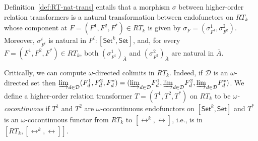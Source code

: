 \documentclass{lmcs}
\theoremstyle{plain}\newtheorem{satz}[thm]{Satz}
\newcommand{\cal}{\mathcal}
\newcommand{\set}{\mathsf{Set}}
\begin{document}
{Definition~\ref{def:RT-nat-trans} entails that a morphism $\sigma$
between higher-order relation transformers is a natural transformation
between endofunctors on $RT_k$ whose component at $F = (F^1,F^2,F^*)
\in RT_k$ is given by $\sigma_F = (\sigma^1_{F^1}, \sigma^2_{F^2})$.
Moreover, $\sigma^i_{F^i}$ is natural in $F^i : [\set^k,\set]$, and,
for every $F = (F^1,F^2,F^*) \in RT_k$, both
$(\sigma^1_{F^1})_{\overline{A}}$ and
$(\sigma^2_{F^2})_{\overline{A}}$ are natural in $\overline{A}$.

Critically, we can compute $\omega$-directed colimits in
$RT_k$. Indeed, if $\cal D$ is an $\omega$-directed set then $\colim{d
  \in {\cal D}}{(F^1_d, F^2_d,F^*_d)} = (\colim{d \in {\cal
    D}}{F^1_d}, \colim{d \in {\cal D}}{F^2_d}, \colim{d \in {\cal
    D}}{F^*_d})$.  We define a higher-order relation transformer $T =
(T^1,T^2,T^*)$ on $RT_k$ to be {\em $\omega$-cocontinuous} if $T^1$
and $T^2$ are $\omega$-cocontinuous endofunctors on $[\set^k,\set]$
and $T^*$ is an $\omega$-cocontinuous functor from $RT_k$ to
$[\rel^k,\rel]$, i.e., is in $[RT_k,[\rel^k,\rel]]$.
%
}
\end{document}
